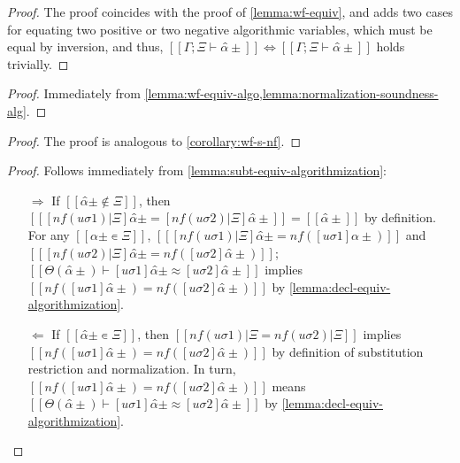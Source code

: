 \lemmaWfEquivAlgo*
\begin{proof}
  The proof coincides with the proof of \cref{lemma:wf-equiv},
  and adds two cases for equating two positive or two negative algorithmic variables,
  which must be equal by inversion, and thus, 
  $[[Γ; Ξ ⊢ α̂±]] \iff [[Γ; Ξ  ⊢ α̂±]]$ holds trivially.
\end{proof}

\corollaryWfNfAlgo*
\begin{proof}
  Immediately from \cref{lemma:wf-equiv-algo,lemma:normalization-soundness-alg}.
\end{proof}

\corollaryNormSubstSigAlgo*
\begin{proof}
  The proof is analogous to \cref{corollary:wf-s-nf}.
\end{proof}


\corollarySubstSubtEquivAlg*
\begin{proof}
  Follows immediately from \cref{lemma:subt-equiv-algorithmization}:
  \begin{itemize}
    \item [$\Rightarrow$]
      If $[[α̂± ∉ Ξ]]$, then $[[ [nf(uσ1)|Ξ]α̂± = [nf(uσ2)|Ξ]α̂± ]] = [[α̂±]]$ by 
      definition. 
      For any $[[α̂± ∊ Ξ]]$, 
      $[[ [nf(uσ1)|Ξ]α̂± = nf([uσ1]α̂±)]]$ and 
      $[[ [nf(uσ2)|Ξ]α̂± = nf([uσ2]α̂±) ]]$; 
      $[[Θ(α̂±) ⊢ [uσ1]α̂± ≈ [uσ2]α̂±]]$ implies
      $[[ nf([uσ1]α̂±) = nf([uσ2]α̂±) ]]$ by \cref{lemma:decl-equiv-algorithmization}.
    \item [$\Leftarrow$]
      If $[[α̂± ∊ Ξ]]$, then 
      $[[nf(uσ1)|Ξ = nf(uσ2)|Ξ]]$ implies
      $[[ nf([uσ1]α̂±) = nf([uσ2]α̂±) ]]$ by definition 
      of substitution restriction and normalization.
      In turn, $[[ nf([uσ1]α̂±) = nf([uσ2]α̂±) ]]$ means
       $[[Θ(α̂±) ⊢ [uσ1]α̂± ≈ [uσ2]α̂±]]$ by \cref{lemma:decl-equiv-algorithmization}.
  \end{itemize}
\end{proof}